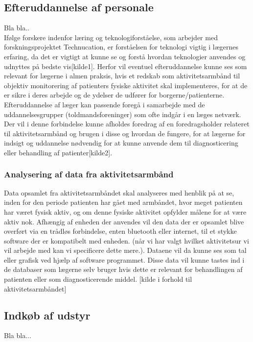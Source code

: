 
\subsection{Efteruddannelse af personale}
Bla bla..\\
Ifølge forskere indenfor læring og teknologiforståelse, som arbejder med forskningsprojektet Technucation, er forståelsen for teknologi vigtig i lægernes erfaring, da det er vigtigt at kunne se og forstå hvordan teknologier anvendes og udnyttes på bedste vis[kilde1]. Herfor vil eventuel efteruddannelse kunne ses som relevant for lægerne i almen praksis, hvis et redskab som aktivitetsarmbånd til objektiv monitorering af patienters fysiske aktivitet skal implementeres, for at de er sikre i deres arbejde og de ydelser de udfører for borgerne/patienterne. 
Efteruddannelse af læger kan passende foregå i samarbejde med de uddannelsesgrupper (toldmandsforeninger) som ofte indgår i en læges netværk. Der vil i denne forbindelse kunne afholdes foredrag af en foredragsholder relateret til aktivitetsarmbånd og brugen i disse og hvordan de fungere, for at lægerne for indsigt og uddannelse nødvendig for at kunne anvende dem til diagnosticering eller behandling af patienter[kilde2]. 
\\
\subsubsection{Analysering af data fra aktivitetsarmbånd}  
Data opsamlet fra aktivitetsarmbåndet skal analyseres med henblik på at se, inden for den periode patienten har gået med armbåndet, hvor meget patienten har været fysisk aktiv, og om denne fysiske aktivitet opfylder målene for at være aktiv nok.  
Afhængig af enheden der anvendes vil den data der er opsamlet blive overført via en trådløs forbindelse, enten bluetooth eller internet, til et stykke software der er kompatibelt med enheden. (når vi har valgt hvilket aktivitetsur vi vil arbejde med kan vi specificere dette mere.). Dataene vil da kunne ses som tal eller grafisk ved hjælp af software programmet. Disse data vil kunne tastes ind i de databaser som lægerne selv bruger hvis dette er relevant for behandlingen af patienten eller som diagnosticerende middel. [kilde i forhold til aktivitetsarmbåndet]

\subsection{Indkøb af udstyr}	
Bla bla...

